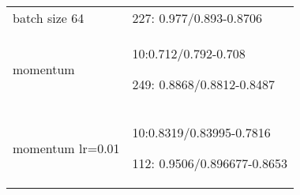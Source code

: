 \documentclass[,table,dvipsnames]{article}
\begin{document}
\begin{tabular}{|p{10cm}|p{5.5cm}| }
	\rowcolor{green!20}
	batch size 64 & 227: 0.977/0.893-0.8706\\
	
	\rowcolor{yellow!20}
	momentum & 10:0.712/0.792-0.708\par 249: 0.8868/0.8812-0.8487\\
	
	\rowcolor{green!20}
	momentum lr=0.01 & 10:0.8319/0.83995-0.7816\par 112: 0.9506/0.896677-0.8653\\
	
	\hline 	
\end{tabular}
\end{document}
